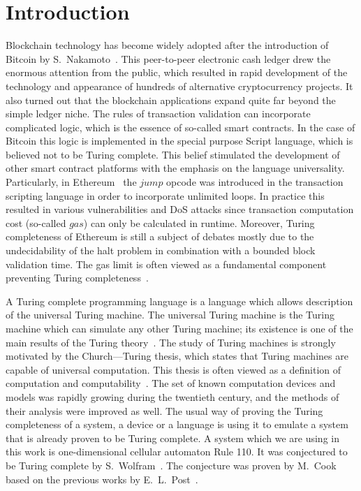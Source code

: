\documentclass[runningheads]{llncs}
\begin{document}
    \section{Introduction}
    Blockchain technology has become widely adopted after the introduction of
    Bitcoin by S.~Nakamoto~\cite{nakamoto2008bitcoin}. This peer-to-peer
    electronic cash ledger drew the enormous attention from the public, which
    resulted in rapid development of the technology and appearance of hundreds
    of alternative cryptocurrency projects. It also turned out that the
    blockchain applications expand quite far beyond the simple ledger niche. The
    rules of transaction validation can incorporate complicated logic, which is
    the essence of so-called smart contracts. In the case of Bitcoin this logic
    is implemented in the special purpose Script language, which is believed not
    to be Turing complete. This belief stimulated the development of other smart
    contract platforms with the emphasis on the language universality.
    Particularly, in Ethereum~\cite{buterin2014next} the $jump$ opcode was
    introduced in the transaction scripting language in order to incorporate
    unlimited loops.  In practice this resulted in various vulnerabilities and
    DoS attacks \cite{atzei2017survey} since transaction computation cost
    (so-called $gas$) can only be calculated in runtime.
    Moreover, Turing completeness of Ethereum is
    still a subject of debates mostly due to the undecidability of the halt problem
    in combination with a bounded block validation time. The gas
    limit is often viewed as a fundamental component preventing
    Turing completeness~\cite{miller2016ethereum}.

    A Turing complete programming language is a language which allows
    description of the universal Turing machine. The universal Turing machine is
    the Turing machine which can simulate any other Turing machine; its
    existence is one of the main results of the Turing
    theory~\cite{turing1937computable}. The study of Turing machines is strongly
    motivated by the Church---Turing thesis, which states that Turing machines
    are capable of universal computation. This thesis is often viewed as a
    definition of computation and computability~\cite{turing1939systems}. The
    set of known computation devices and models was rapidly growing during the
    twentieth century, and the methods of their analysis were improved as well.
    The usual way of proving the Turing completeness of a system,
    a device or a language is using it to emulate a system that is already
    proven to be Turing complete. A system which we are using in this work is 
    one-dimensional cellular automaton Rule 110. It was conjectured to
    be Turing complete by S.~Wolfram~\cite{wolfram1986theory}. The conjecture
    was proven by M.~Cook~\cite{cook2004universality} based on the previous
    works by E.~L.~Post~\cite{post1943formal}.
\end{document}
